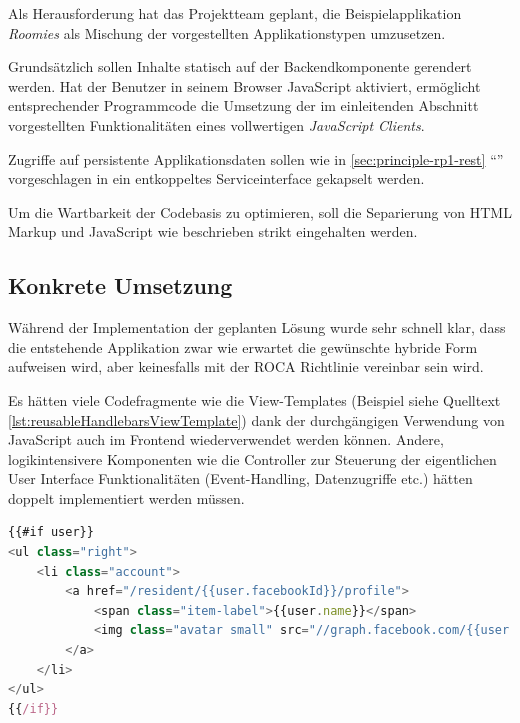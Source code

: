 Als Herausforderung hat das Projektteam geplant, die Beispielapplikation \emph{Roomies} als Mischung der vorgestellten Applikationstypen umzusetzen.

Grundsätzlich sollen Inhalte statisch auf der Backendkomponente gerendert werden. Hat der Benutzer in seinem Browser JavaScript aktiviert, ermöglicht entsprechender Programmcode die Umsetzung der im einleitenden Abschnitt vorgestellten Funktionalitäten eines vollwertigen \emph{JavaScript Clients}.

Zugriffe auf persistente Applikationsdaten sollen wie in \ref{sec:principle-rp1-rest} ``'' vorgeschlagen in ein entkoppeltes Serviceinterface gekapselt werden.

Um die Wartbarkeit der Codebasis zu optimieren, soll die Separierung von HTML Markup und JavaScript wie beschrieben strikt eingehalten werden.


\subsection*{Konkrete Umsetzung}

Während der Implementation der geplanten Lösung wurde sehr schnell klar, dass die entstehende Applikation zwar wie erwartet die gewünschte hybride Form aufweisen wird, aber keinesfalls mit der ROCA Richtlinie \emph{} vereinbar sein wird.

Es hätten viele Codefragmente wie die View-Templates (Beispiel siehe Quelltext \ref{lst:reusableHandlebarsViewTemplate}) dank der durchgängigen Verwendung von JavaScript auch im Frontend wiederverwendet werden können. Andere, logikintensivere Komponenten wie die Controller zur Steuerung der eigentlichen User Interface Funktionalitäten (Event-Handling, Datenzugriffe etc.) hätten doppelt implementiert werden müssen.

\begin{lstlisting}[language=JavaScript, firstnumber=31, caption={Ausschnitt aus dem \emph{Handlebars} \cite{Handlebars} Template zur Darstellung von Benutzerinformation in der Menüleiste von \emph{Roomies} \cite{roomiesMenuTemplate}}, label={lst:reusableHandlebarsViewTemplate}]
{{#if user}}
<ul class="right">
	<li class="account">
		<a href="/resident/{{user.facebookId}}/profile">
			<span class="item-label">{{user.name}}</span>
			<img class="avatar small" src="//graph.facebook.com/{{user.facebookId}}/picture" />
		</a>
	</li>
</ul>
{{/if}}
\end{lstlisting}

